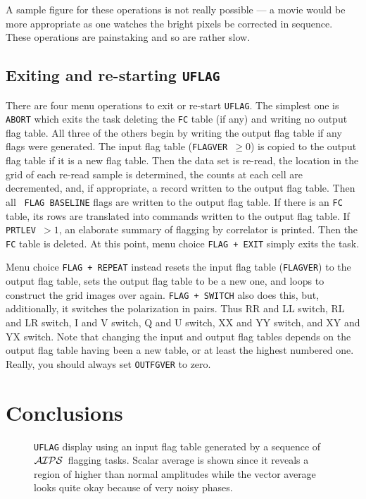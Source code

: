 \documentclass[twoside]{article}
\newcommand{\AIPS}{{$\cal AIPS\/$}}
\newcommand{\putfig}[1]{\texttt{[image: \#1]}}
\begin{document}
A sample figure for these operations is not really possible --- a movie
would be more appropriate as one watches the bright pixels be
corrected in sequence.  These operations are painstaking and so are
rather slow.

\subsection{Exiting and re-starting {\tt UFLAG}}

There are four menu operations to exit or re-start {\tt UFLAG}\@.  The
simplest one is {\tt ABORT} which exits the task deleting the {\tt FC}
table (if any) and writing no output flag table.  All three of the
others begin by writing the output flag table if any flags were
generated.  The input flag table ({\tt FLAGVER $\geq 0$}) is copied to
the output flag table if it is a new flag table.  Then the data set is
re-read, the location in the grid of each re-read sample is
determined, the counts at each cell are decremented, and, if
appropriate, a record written to the output flag table.  Then all {\tt
  FLAG BASELINE} flags are written to the output flag table.  If there
is an {\tt FC} table, its rows are translated into commands written to
the output flag table.  If {\tt PRTLEV $> 1$}, an elaborate summary of
flagging by correlator is printed.  Then the {\tt FC} table is
deleted.  At this point, menu choice {\tt FLAG + EXIT} simply exits
the task.

Menu choice {\tt FLAG + REPEAT} instead resets the input flag table
({\tt FLAGVER}) to the output flag table, sets the output flag table
to be a new one, and loops to construct the grid images over again.
{\tt FLAG + SWITCH} also does this, but, additionally, it switches the
polarization in pairs.  Thus RR and LL switch, RL and LR switch, I
and V switch, Q and U switch, XX and YY switch, and XY and YX switch.
Note that changing the input and output flag tables depends on the
output flag table having been a new table, or at least the highest
numbered one.  Really, you should always set {\tt OUTFGVER} to zero.

\section{Conclusions}

\begin{figure}
\begin{center}
\resizebox{6.5in}{!}{\putfig{Preflagged.eps}}
\caption{{\tt UFLAG} display using an input flag table generated by a
  sequence of \AIPS\ flagging tasks.  Scalar average is shown since it
reveals a region of higher than normal amplitudes while the vector
average looks quite okay because of very noisy phases.}
\label{fig:Preflagged}
\end{center}
\end{figure}
\end{document}
